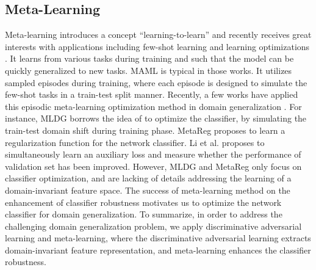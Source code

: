 \documentclass[twocolumn,preprint]{elsarticle}
\begin{document}
\subsection{Meta-Learning} \label{sub:meta-learning}
Meta-learning introduces a concept ``learning-to-learn'' and recently receives great interests with applications including few-shot learning \cite{maml,reptile,meta-implicit} and learning optimizations \cite{li2017learning,gdbygd}. It learns from various tasks during training and such that the model can be quickly generalized to new tasks. 
MAML \cite{maml} is typical in those works. It utilizes sampled episodes during training, where each episode is designed to simulate the few-shot tasks in a train-test split manner. 
Recently, a few works have applied this episodic meta-learning optimization method in domain generalization \cite{mldg,metareg,feature-critic}. For instance, MLDG \cite{mldg} borrows the idea of \cite{maml} to optimize the classifier, by simulating the train-test domain shift during training phase.
MetaReg \cite{metareg} proposes to learn a regularization function for the network classifier.
Li et al. \cite{feature-critic} proposes to simultaneously learn an auxiliary loss and measure whether the performance of validation set has been improved. 
However, MLDG \cite{mldg} and MetaReg \cite{metareg} only focus on classifier optimization, and are lacking of details addressing the learning of a domain-invariant feature space.
The success of meta-learning method on the enhancement of classifier robustness motivates us to optimize the network classifier for domain generalization.
To summarize, in order to address the challenging domain generalization problem, we apply discriminative adversarial learning and meta-learning, where the discriminative adversarial learning extracts domain-invariant feature representation, and meta-learning enhances the classifier robustness.
\end{document}
